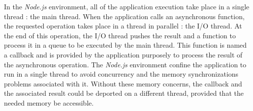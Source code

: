 












In the \textit{Node.js} environment, all of the application execution take place in a single thread : the main thread.
When the application calls an asynchronous function, the requested operation takes place in a thread in parallel : the I/O thread.
At the end of this operation, the I/O thread pushes the result and a function to process it in a queue to be executed by the main thread.
This function is named a callback and is provided by the application purposely to process the result of the asynchronous operation.
The \textit{Node.js} environment confine the application to run in a single thread to avoid concurrency and the memory synchronizations problems associated with it.
Without these memory concerns, the callback and the associated result could be deported on a different thread, provided that the needed memory be accessible.

